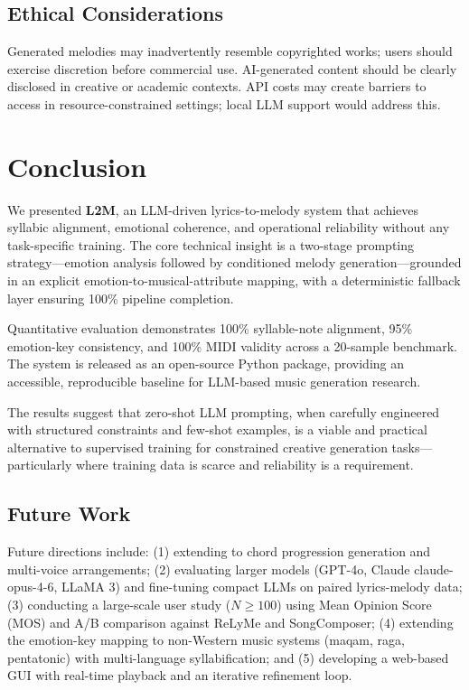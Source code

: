 \documentclass[conference]{IEEEtran}
\begin{document}
\subsection{Ethical Considerations}

Generated melodies may inadvertently resemble copyrighted works; users should
exercise discretion before commercial use. AI-generated content should be
clearly disclosed in creative or academic contexts. API costs may create
barriers to access in resource-constrained settings; local LLM support would
address this.

\section{Conclusion}

We presented \textbf{L2M}, an LLM-driven lyrics-to-melody system that achieves
syllabic alignment, emotional coherence, and operational reliability without
any task-specific training. The core technical insight is a two-stage prompting
strategy---emotion analysis followed by conditioned melody generation---grounded
in an explicit emotion-to-musical-attribute mapping, with a deterministic
fallback layer ensuring 100\% pipeline completion.

Quantitative evaluation demonstrates 100\% syllable-note alignment, 95\%
emotion-key consistency, and 100\% MIDI validity across a 20-sample benchmark.
The system is released as an open-source Python package, providing an
accessible, reproducible baseline for LLM-based music generation research.

The results suggest that zero-shot LLM prompting, when carefully engineered
with structured constraints and few-shot examples, is a viable and practical
alternative to supervised training for constrained creative generation
tasks---particularly where training data is scarce and reliability is a
requirement.

\subsection{Future Work}

Future directions include: (1) extending to chord progression generation and
multi-voice arrangements; (2) evaluating larger models (GPT-4o, Claude
claude-opus-4-6, LLaMA 3) and fine-tuning compact LLMs on paired lyrics-melody data; (3)
conducting a large-scale user study ($N \ge 100$) using Mean Opinion Score
(MOS) and A/B comparison against ReLyMe and SongComposer; (4) extending the
emotion-key mapping to non-Western music systems (maqam, raga, pentatonic) with
multi-language syllabification; and (5) developing a web-based GUI with
real-time playback and an iterative refinement loop.
\end{document}
